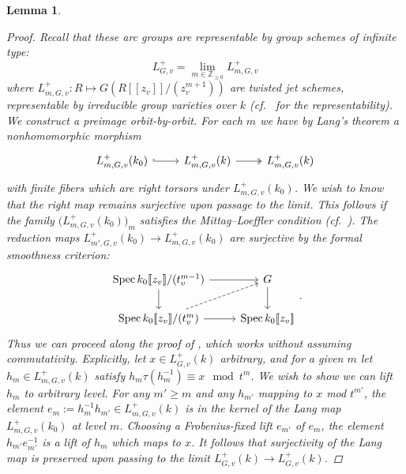 \documentclass[openany]{amsbook}
\newtheorem{lemma}[theorem]{Lemma}
\theoremstyle{definition}
\theoremstyle{remark}
\numberwithin{equation}{section}
\newcommand{\Z}{\mathbb{Z}}
\newcommand{\llbracket}{[\![}
\newcommand{\rrbracket}{]\!]}
\renewcommand{\-}{\operatorname{-}}
\newcommand{\Spec}{\operatorname{Spec}}
\begin{document}
\begin{lemma}
\begin{proof}
    Recall that these arc groups are representable by group schemes of infinite type:
        \[
            L^+_{G,v} = \lim_{m \in \Z_{\ge 0}} L^+_{m,G,v} 
        \]
        where $L^+_{m,G,v}: R \mapsto G(R\llbracket z_v\rrbracket/(z_v^{m+1}))$ are twisted jet schemes, representable by irreducible group varieties over $k$ (cf.\ \cite[Prop.\ 2]{HeinlothRelUnif} for the representability). We construct a preimage orbit-by-orbit. For each $m$ we have by Lang's theorem a nonhomomorphic morphism
        \[
            \begin{tikzcd}[ampersand replacement=\&]
                 L^+_{m,G,v}(k_0) \ar[r, hook] \& L^+_{m,G,v}(k) \ar[r, two heads] \& L^+_{m,G,v}(k)
            \end{tikzcd}
        \]
        with finite fibers which are right torsors under $L^+_{m,G,v}(k_0)$. We wish to know that the right map remains surjective upon passage to the limit. This follows if the family $\big(L^+_{m,G,v}(k_0) \big)_m$ satisfies the Mittag--Loeffler condition (cf.\ \cite[Tag 0594]{stacks-project}). The reduction maps $L^+_{m',G,v}(k_0) \to L^+_{m,G,v}(k_0)$ are surjective by the formal smoothness criterion:
        \[
            \begin{tikzcd}[ampersand replacement=\&]
                \Spec k_0 \llbracket z_v\rrbracket/(t_v^{m-1}) \ar[r] \ar[d] \& G \ar[d] \\
                \Spec k_0 \llbracket z_v\rrbracket/(t_v^m) \ar[r] \ar[ur, dashed] \& \Spec k_0\llbracket z_v\rrbracket
            \end{tikzcd}.
        \]
        Thus we can proceed along the proof of \cite[Tag 0598]{stacks-project}, which works without assuming commutativity. Explicitly, let $x \in L^+_{G,v}(k)$ arbitrary, and for a given $m$ let $h_m \in L_{m, G,v}^+(k)$ satisfy $h_m \tau(h_m^{-1}) \equiv x \mod t^m$. We wish to show we can lift $h_m$ to arbitrary level. For any $m' \ge m$ and any $h_{m'}$ mapping to $x$ mod $t^{m'}$, the element $e_m := h_{m}^{-1} h_{m'} \in L^+_{m,G,v}(k)$ is in the kernel of the Lang map $L^+_{m,G,v}(k_0)$ at level $m$. Choosing a Frobenius-fixed lift $e_{m'}$ of $e_m$, the element $h_{m'} e_{m'}^{-1}$ is a lift of $h_m$ which maps to $x$. It follows that surjectivity of the Lang map is preserved upon passing to the limit $L^+_{G,v}(k) \to L^+_{G,v}(k)$.
    \end{proof}
\end{lemma}
\end{document}
